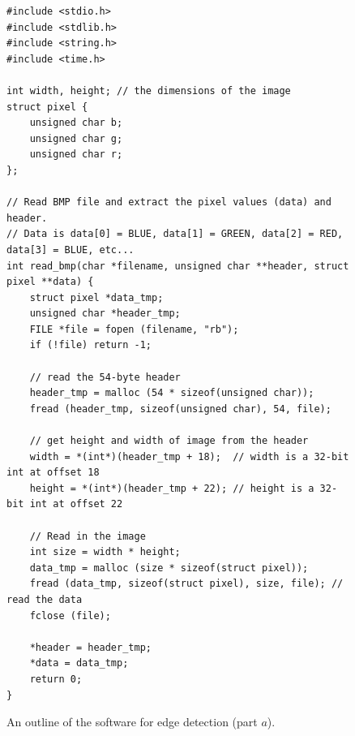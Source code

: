 \documentclass[epsfig,10pt,fullpage]{article}
\begin{document}
\lstset{language=C,numbers=none,escapechar=|,basicstyle=\small\ttfamily,}
\begin{figure}[h]
\begin{center}
\begin{minipage}[t]{15.5 cm}
\begin{lstlisting}[name=skeleton]
#include <stdio.h>
#include <stdlib.h>
#include <string.h>
#include <time.h>

int width, height; // the dimensions of the image
struct pixel {
    unsigned char b;
    unsigned char g;
    unsigned char r;
};

// Read BMP file and extract the pixel values (data) and header.
// Data is data[0] = BLUE, data[1] = GREEN, data[2] = RED, data[3] = BLUE, etc...
int read_bmp(char *filename, unsigned char **header, struct pixel **data) {
    struct pixel *data_tmp;
    unsigned char *header_tmp;
    FILE *file = fopen (filename, "rb");
    if (!file) return -1;
    
    // read the 54-byte header
    header_tmp = malloc (54 * sizeof(unsigned char));
    fread (header_tmp, sizeof(unsigned char), 54, file); 

    // get height and width of image from the header
    width = *(int*)(header_tmp + 18);  // width is a 32-bit int at offset 18
    height = *(int*)(header_tmp + 22); // height is a 32-bit int at offset 22

    // Read in the image
    int size = width * height;
    data_tmp = malloc (size * sizeof(struct pixel)); 
    fread (data_tmp, sizeof(struct pixel), size, file); // read the data
    fclose (file);
    
    *header = header_tmp;
    *data = data_tmp;
    return 0;
}
\end{lstlisting}
\end{minipage}
\caption{An outline of the software for edge detection (part $a$).}
\label{fig:skeleton}
\end{center}
\end{figure}
\end{document}
